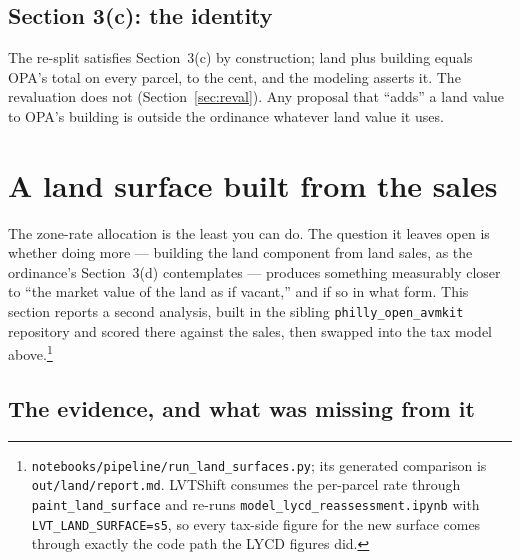 \documentclass[11pt]{article}
\begin{document}
\subsection{Section 3(c): the identity}

The re-split satisfies Section~3(c) by construction; land plus building equals OPA's total on
every parcel, to the cent, and the modeling asserts it. The revaluation does not
(Section~\ref{sec:reval}). Any proposal that ``adds'' a land value to OPA's building is outside
the ordinance whatever land value it uses.

\section{A land surface built from the sales}\label{sec:sales}

The zone-rate allocation is the least you can do. The question it leaves open is whether
doing more --- building the land component from land sales, as the ordinance's Section~3(d)
contemplates --- produces something measurably closer to ``the market value of the land as if
vacant,'' and if so in what form. This section reports a second analysis, built in the
sibling \texttt{philly\_open\_avmkit} repository and scored there against the sales, then
swapped into the tax model above.\footnote{\texttt{notebooks/pipeline/run\_land\_surfaces.py};
its generated comparison is \texttt{out/land/report.md}. LVTShift consumes the per-parcel rate
through \texttt{paint\_land\_surface} and re-runs \texttt{model\_lycd\_reassessment.ipynb} with
\texttt{LVT\_LAND\_SURFACE=s5}, so every tax-side figure for the new surface comes through
exactly the code path the LYCD figures did.}

\subsection{The evidence, and what was missing from it}

\begin{table}[t]
  \centering
  \caption{Three streams of land-price evidence, time-adjusted to the valuation date and
  filtered identically (single-parcel deeds, no building footprint on a recorded-vacant lot,
  plausible \$/sqft, no condominium units).}
  \label{tab:witnesses}
  
\end{table}
\end{document}
